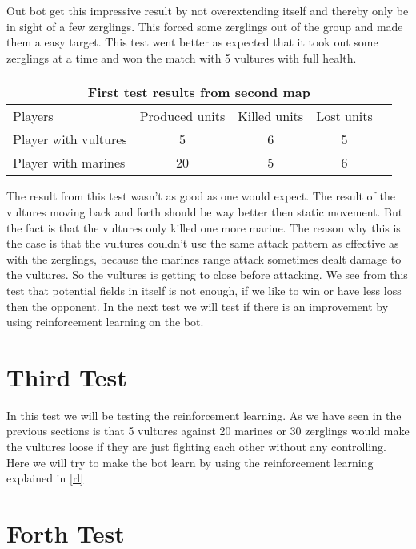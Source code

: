 Out bot get this impressive result by not overextending itself and thereby only be in sight of a few zerglings. This forced some zerglings out of the group and made them a easy target. This test went better as expected that it took out some zerglings at a time and won the match with 5 vultures with full health.

\begin{centering}
 \begin{tabular}{|l||c|c|c|c|}
	\multicolumn{5}{c}{First test results from second map} \\
	\hline
	Players & Produced units & Killed units & Lost units\\
	\hline
	\hline
		Player with vultures & 5 & 6 & 5\\
	\hline
		Player with marines & 20 & 5 & 6\\
	\hline

\end{tabular}
\end{centering}


The result from this test wasn't as good as one would expect. The result of the vultures moving back and forth should be way better then static movement. But the fact is that the vultures only killed one more marine. The reason why this is the case is that the vultures couldn't use the same attack pattern as effective as with the zerglings, because the marines range attack sometimes dealt damage to the vultures. So the vultures is getting to close before attacking.
We see from this test that potential fields in itself is not enough, if we like to win or have less loss then the opponent. In the next test we will test if there is an improvement by using reinforcement learning on the bot.

\section{Third Test}
In this test we will be testing the reinforcement learning. As we have seen in the previous sections is that 5 vultures against 20 marines or 30 zerglings would make the vultures loose if they are just fighting each other without any controlling. Here we will try to make the bot learn by using the reinforcement learning explained in \ref{rl} 

\section{Forth Test}



